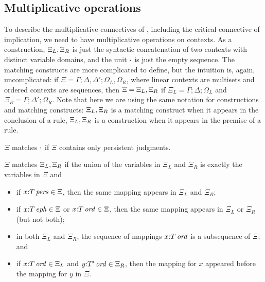
\subsection{Multiplicative operations}

To describe the multiplicative connectives of \ollll, including the critical
connective of implication, we need to have multiplicative operations on 
contexts. As a construction, ${\Xi_L},{\Xi_R}$ is just the
syntactic concatenation of two contexts with distinct variable domains, and
the unit $\cdot$ is just the empty sequence. The matching constructs
are more complicated to define, but the intuition is, again, 
uncomplicated: if 
$\Xi = \Gamma; \Delta, \Delta'; \Omega_L, \Omega_R$, where linear contexts
are multisets and ordered contexts are sequences, then 
$\Xi = {\Xi_L},{\Xi_R}$ if $\Xi_L = \Gamma; \Delta; \Omega_L$ and
$\Xi_R = \Gamma; \Delta'; \Omega_R$. Note that here we are using the same 
notation for constructions and matching constructs: 
${\Xi_L},{\Xi_R}$ is a matching construct when it appears
in the conclusion of a rule, ${\Xi_L},{\Xi_R}$ is a construction
when it appears in the premise of a rule.

\bigskip
\begin{definition}[Conjunction]
$\Xi$ matches $\cdot$ if $\Xi$ contains only
persistent judgments.

\smallskip
\noindent
$\Xi$ matches ${\Xi_L},{\Xi_R}$ if the union 
of the variables in $\Xi_L$ and $\Xi_R$ is exactly the variables in $\Xi$
and 
\begin{itemize}
\item if $x{:}{T}\,{{\it pers}} \in \Xi$, then the same mapping appears in $\Xi_L$
  and $\Xi_R$;
\item if $x{:}{T}\,{{\it eph}} \in \Xi$ or $x{:}{T}\,{{\it ord}} \in \Xi$, then the
  same mapping appears in $\Xi_L$ or $\Xi_R$ (but not both); 
\item in both $\Xi_L$ and $\Xi_R$, 
  the sequence of mappings $x{:}{T}\,{{\it ord}}$ 
  is a subsequence of $\Xi$; and 
\item if $x{:}{T}\,{{\it ord}} \in \Xi_L$ and $y{:}{T'}\,{{\it ord}} \in \Xi_R$, then
  the mapping for $x$ appeared before the mapping for $y$ in $\Xi$. 
\end{itemize}
\end{definition}
\bigskip

